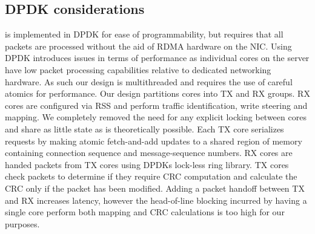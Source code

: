 \subsection{DPDK considerations}

{\sword} is implemented in DPDK for ease of programmability, but
requires that all packets are processed without the aid of RDMA
hardware on the NIC. Using DPDK introduces issues in terms of
performance as individual cores on the server have low packet
processing capabilities relative to dedicated networking hardware. As
such our design is multithreaded and requires the use of careful
atomics for performance.  Our design partitions cores into TX and RX
groups. RX cores are configured via RSS and perform traffic
identification, write steering and mapping. We completely removed the
need for any explicit locking between cores and share as little state
as is theoretically possible. Each TX core serializes requests by
making atomic fetch-and-add updates to a shared region of memory
containing connection sequence and message-sequence numbers. RX cores
are handed packets from TX cores using DPDKs lock-less ring
library. TX cores check packets to determine if they require CRC
computation and calculate the CRC only if the packet has been
modified. Adding a packet handoff between TX and RX increases latency,
however the head-of-line blocking incurred by having a single core
perform both mapping and CRC calculations is too high for our purposes.
